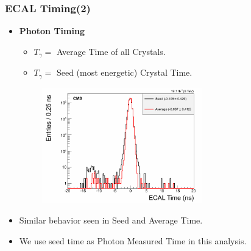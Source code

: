 \documentclass{beamer}
\begin{document}
\begin{frame}
\frametitle{ECAL Timing(2)}
  \begin{minipage}[b]{0.8\paperwidth}
   \begin{itemize}
    \item \textcolor{UMN@Maroon}{\textbf{Photon Timing}}
        \begin{itemize}
         \item $T_{\gamma} =$ Average Time of all Crystals.
         \item $T_{\gamma} =$ Seed (most energetic) Crystal Time.
        \end{itemize}
      
       \includegraphics[height=5.0cm,width=0.70\textwidth]            {THESISPLOTS/AverageVsSeedTime_ECAL.png}   
  \end{itemize}
  \begin{itemize}
   \item  Similar behavior seen in Seed and Average Time.
   \item  We use seed time as Photon Measured Time in this analysis.
  \end{itemize}
  
 \end{minipage}
\end{frame}
\end{document}

